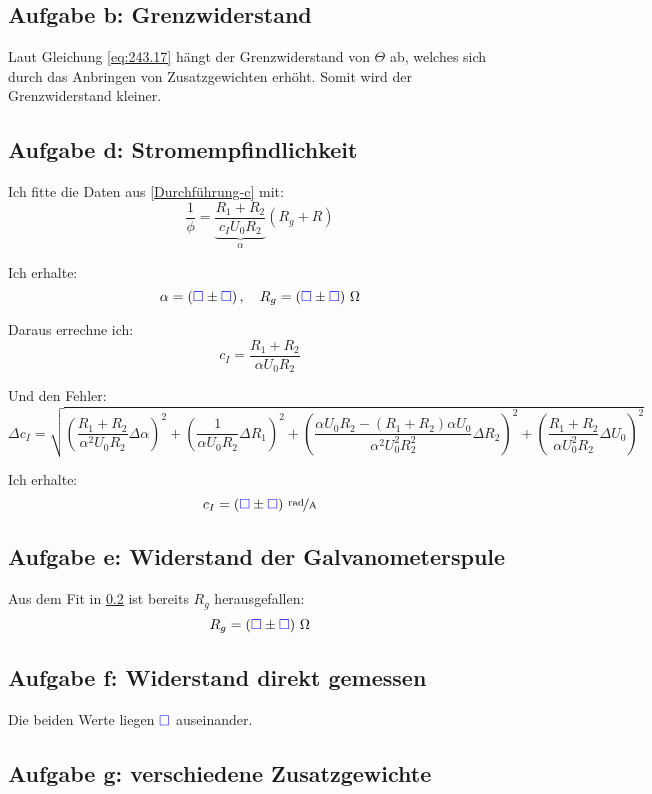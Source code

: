\documentclass[11pt, ngerman]{article}
\newcommand{\emesswert}{\left(\messwert \pm \messwert \right)}
\newcommand{\messwert}{\textcolor{blue}{\square}}
\begin{document}
\subsection{Aufgabe b: Grenzwiderstand}

\label{Auswertung-b}

Laut Gleichung \eqref{eq:243.17} hängt der Grenzwiderstand von $\Theta$ ab,
welches sich durch das Anbringen von Zusatzgewichten erhöht. Somit wird der
Grenzwiderstand kleiner.

\subsection{Aufgabe d: Stromempfindlichkeit}

\label{Auswertung-d}

Ich fitte die Daten aus \ref{Durchführung-c} mit:
\[
	\frac 1 \phi
	= \underbrace{\frac{R_1 + R_2}{c_I U_0 R_2}}_{\alpha} (R_g + R)
\]

Ich erhalte:
\[
	\alpha = \emesswert
	, \quad
	R_g = \unit[\emesswert] \Omega
\]

Daraus errechne ich:
\[
	c_I = \frac{R_1 + R_2}{\alpha U_0 R_2}
\]

Und den Fehler:
\[
	\Delta c_I
	= \sqrt{
		\left( \frac{R_1 + R_2}{\alpha^2 U_0 R_2} \Delta \alpha \right)^2
		+ \left( \frac{1}{\alpha U_0 R_2} \Delta R_1 \right)^2
		+ \left( \frac{\alpha U_0 R_2 - (R_1 + R_2)\alpha U_0}{\alpha^2 U_0^2 R_2^2} \Delta R_2 \right)^2
		+ \left( \frac{R_1 + R_2}{\alpha U_0^2 R_2} \Delta U_0 \right)^2
	}
\]

Ich erhalte:
\[ c_I = \unitfrac[\emesswert]{rad}{A} \]

\subsection{Aufgabe e: Widerstand der Galvanometerspule}

Aus dem Fit in \ref{Auswertung-d} ist bereits $R_g$ herausgefallen:
\[
	R_g = \unit[\emesswert] \Omega
\]

\subsection{Aufgabe f: Widerstand direkt gemessen}

Die beiden Werte liegen $\messwert$ auseinander.

\subsection{Aufgabe g: verschiedene Zusatzgewichte}
\end{document}
